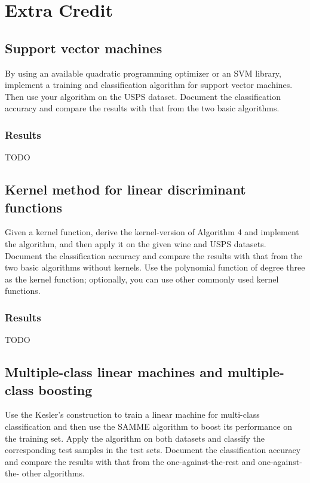 \documentclass{article}
\begin{document}

\section{Extra Credit}
\subsection{Support vector machines}
By using an available quadratic programming optimizer or an SVM library, implement a training and classification algorithm for support vector machines. Then use your algorithm on the USPS dataset. Document the classification accuracy and compare the results with that from the two basic algorithms.

\subsubsection*{Results}
{\large TODO}


\subsection{Kernel method for linear discriminant functions}
Given a kernel function, derive the kernel-version of Algorithm 4 and implement the algorithm, and then apply it on the given wine and USPS datasets. Document the classification accuracy and compare the results with that from the two basic algorithms without kernels. Use the polynomial function of degree three as the kernel function; optionally, you can use other commonly used kernel functions.

\subsubsection*{Results}
{\large TODO}



\subsection{Multiple-class linear machines and multiple-class boosting}
Use the Kesler’s construction to train a linear machine for multi-class classification and then use the SAMME algorithm to boost its performance on the training set. Apply the algorithm on both datasets and classify the corresponding test samples in the test sets. Document the classification accuracy and compare the results with that from the one-against-the-rest and one-against-the- other algorithms.
\end{document}
